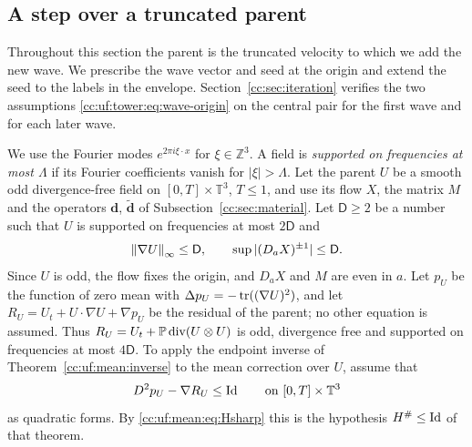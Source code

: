 \subsection{A step over a truncated parent}\label{cc:uf:sec:parent-step}
Throughout this section the parent is the truncated velocity to which
we add the new wave. We prescribe the wave vector and seed at the origin
and extend the seed to the labels in the envelope.
Section~\ref{cc:sec:iteration} verifies the two assumptions
\eqref{cc:uf:tower:eq:wave-origin} on the central pair for the first
wave and for each later wave.

We use the Fourier modes $e^{2\pi i\xi\cdot x}$ for $\xi\in\mathbb Z^3$.
A field is \emph{supported on frequencies at most $\Lambda$} if its
Fourier coefficients vanish for $|\xi|>\Lambda$. Let
the parent $U$ be a smooth odd divergence-free field on
$[0,T]\times\mathbb T^3$, $T\le1$, and use its flow $X$, the matrix $M$
and the operators $\mathbf d$, $\widetilde{\mathbf d}$ of
Subsection~\ref{cc:sec:material}. Let $\mathsf D\ge2$ be a number such
that $U$ is supported on frequencies at most $2\mathsf D$ and
\begin{equation}\label{cc:uf:tower:eq:parent-bound}
 \left\lVert\nabla U\right\rVert_\infty\le\mathsf D,\qquad
 \sup|(D_aX)^{\pm1}|\le\mathsf D .
\end{equation}
Since $U$ is odd, the flow fixes the origin, and $D_aX$ and $M$ are even
in $a$. Let $p_U$ be the function of zero mean with
$\Delta p_U=-\operatorname{tr}((\nabla U)^2)$, and let
$R_U=U_t+U\cdot\nabla U+\nabla p_U$ be the residual of the parent; no
other equation is assumed. Thus $R_U=U_t+\mathbb P\operatorname{div}(U\otimes U)$ is odd,
divergence free and supported on frequencies at most $4\mathsf D$.
To apply the endpoint inverse of Theorem~\ref{cc:uf:mean:inverse}
to the mean correction over $U$, assume that
\begin{equation}\label{cc:uf:tower:eq:parent-coercive}
 D^2p_U-\nabla R_U\le\operatorname{Id}\qquad\hbox{on }[0,T]\times\mathbb T^3
\end{equation}
as quadratic forms. By \eqref{cc:uf:mean:eq:Hsharp} this is the
hypothesis $H^\#\le\operatorname{Id}$ of that theorem.

